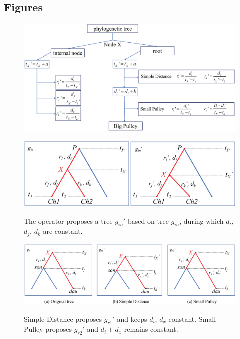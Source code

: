 \documentclass{bmcart}
\begin{document}
\begin{backmatter}

\section*{Figures}
\begin{figure}[h!]
\includegraphics[width=12cm]{flowchart.eps}\\
\caption{
              }
\label{flowchart}
\end{figure}

\begin{figure}[h!]
\includegraphics[width=12cm]{internalnodes.eps}\\
\caption{
             The operator proposes a tree ${g_{in}}'$ based on tree $g_{in}$, during which $d_i$, $d_j$, $d_k$ are constant.}
\label{internalnodes}
\end{figure}

\begin{figure}[h!]
\includegraphics[width=12cm]{rootstrategy.eps}\\
\caption{
             Simple Distance proposes ${g_{r1}}'$ and keeps $d_i$, $d_x$ constant. Small Pulley proposes ${g_{r2}}'$ and ${d_i} + {d_x}$ remains constant.}
\label{simpledistance}
\end{figure}



\end{backmatter}
\end{document}
